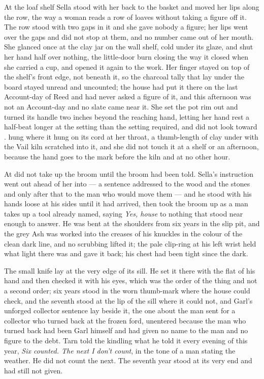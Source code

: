 At the loaf shelf Sella stood with her back to the basket and moved her lips along the row, the way a woman reads a row of loaves without taking a figure off it. The row stood with two gaps in it and she gave nobody a figure; her lips went over the gaps and did not stop at them, and no number came out of her mouth. She glanced once at the clay jar on the wall shelf, cold under its glaze, and shut her hand half over nothing, the little-door burn closing the way it closed when she carried a cup, and opened it again to the work. Her finger stayed on top of the shelf's front edge, not beneath it, so the charcoal tally that lay under the board stayed unread and uncounted; the house had put it there on the last Account-day of Reed and had never asked a figure of it, and this afternoon was not an Account-day and no slate came near it. She set the pot rim out and turned its handle two inches beyond the reaching hand, letting her hand rest a half-beat longer at the setting than the setting required, and did not look toward .  hung where it hung on its cord at her throat, a thumb-length of clay under  with the Vail kiln scratched into it, and she did not touch it at a shelf or an afternoon, because the hand goes to the mark before the kiln and at no other hour.

At   did not take up the broom until the broom had been told. Sella's instruction went out ahead of her into  --- a sentence addressed to the wood and the stones and only after that to the man who would move them --- and he stood with his hands loose at his sides until it had arrived, then took the broom up as a man takes up a tool already named, saying \emph{Yes, house} to nothing that stood near enough to answer. He was bent at the shoulders from six years in the slip pit, and the grey Ash was worked into the creases of his knuckles in the colour of the clean dark line, and no scrubbing lifted it; the pale clip-ring at his left wrist held what light there was and gave it back; his chest had been tight since the dark.

The small knife lay at the very edge of its sill. He set it there with the flat of his hand and then checked it with his eyes, which was the order of the thing and not a second order; six years stood in the worn thumb-mark where the house could check, and the seventh stood at the lip of the sill where it could not, and Garl's unforged collector sentence lay beside it, the one about the man sent for a collector who turned back at the frozen ford, unentered because the man who turned back had been Garl himself and had given no name to the man and no figure to the debt. Tarn told the kindling what he told it every evening of this year, \emph{Six counted. The next I don't count}, in the tone of a man stating the weather. He did not count the next. The seventh year stood at its very end and had still not given.

